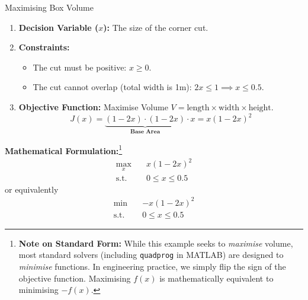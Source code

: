 \begin{examplebox}{Maximising Box Volume}
	\begin{enumerate}
		\item \textbf{Decision Variable ($x$):} The size of the corner cut.
		\item \textbf{Constraints:} 
		\begin{itemize}
			\item The cut must be positive: $x \geq 0$.
			\item The cut cannot overlap (total width is 1m): $2x \leq 1 \implies x \leq 0.5$.
		\end{itemize}
		\item \textbf{Objective Function:} Maximise Volume $V = \text{length} \times \text{width} \times \text{height}$.
		\[ J(x) = \underbrace{(1-2x) \cdot (1-2x)}_{\textbf{Base Area}} \cdot x = x(1-2x)^2 \]
	\end{enumerate}
	
	\textbf{Mathematical Formulation:}\footnote{ \textbf{Note on Standard Form:} While this example seeks to \textit{maximise} volume, most standard solvers (including \texttt{quadprog} in MATLAB) are designed to \textit{minimise} functions. In engineering practice, we simply flip the sign of the objective function. Maximising $f(x)$ is mathematically equivalent to minimising $-f(x)$.}
	\begin{equation*}
		\begin{aligned}
			\max_{x} \quad & x(1-2x)^2 \\
			\text{s.t.} \quad & 0 \leq x \leq 0.5
		\end{aligned}
	\end{equation*}
	or equivalently
		\begin{equation*}
		\begin{aligned}
			\min \quad & -x(1-2x)^2 \\
			\text{s.t.} \quad & 0 \leq x \leq 0.5
		\end{aligned}
		\end{equation*}
\end{examplebox}


